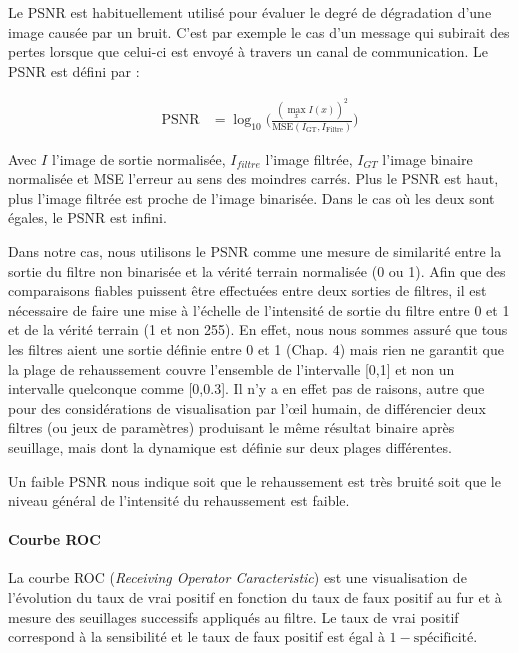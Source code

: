 Le PSNR est habituellement utilisé pour évaluer le degré de dégradation d'une image causée par un bruit. C'est par exemple le cas d'un message qui subirait des pertes lorsque que celui-ci est envoyé à travers un canal de communication. Le PSNR est défini par :

\begin{align}%
 \nonumber
  \textrm{PSNR} & = \log_{10}\Big( \frac{ (\max_x I(x))^2  }{ \textrm{MSE}( I_{\textrm{GT}}, I_{\textrm{Filtre}} ) } \Big)
\end{align}

Avec $I$ l'image de sortie normalisée, $I_{filtre}$ l'image filtrée, $I_{GT}$ l'image binaire normalisée et MSE l'erreur au sens des moindres carrés. Plus le PSNR est haut, plus l'image filtrée est proche de l'image binarisée. Dans le cas où les deux sont égales, le PSNR est infini.

Dans notre cas, nous utilisons le PSNR comme une mesure de similarité entre la sortie du filtre non binarisée et la vérité terrain normalisée (0 ou 1). Afin que des comparaisons fiables puissent être effectuées entre deux sorties de filtres, il est nécessaire de faire une mise à l'échelle de l'intensité de sortie du filtre entre 0 et 1 et de la vérité terrain (1 et non 255). En effet, nous nous sommes assuré que tous les filtres aient une sortie définie entre 0 et 1 (Chap. 4) mais rien ne garantit que la plage de rehaussement couvre l'ensemble de l'intervalle [0,1] et non un intervalle quelconque comme [0,0.3]. Il n'y a en effet pas de raisons, autre que pour des considérations de visualisation par l'œil humain, de différencier deux filtres (ou jeux de paramètres) produisant le même résultat binaire après seuillage, mais dont la dynamique est définie sur deux plages différentes.

Un faible PSNR nous indique soit que le rehaussement est très bruité soit que le niveau général de l'intensité du rehaussement est faible.


\paragraph{Courbe ROC}

La courbe ROC (\textit{Receiving Operator Caracteristic}) est une visualisation de l'évolution du taux de vrai positif en fonction du taux de faux positif au fur et à mesure des seuillages successifs appliqués au filtre. Le taux de vrai positif correspond à la sensibilité et le taux de faux positif est égal à $1-\text{spécificité}$. 

